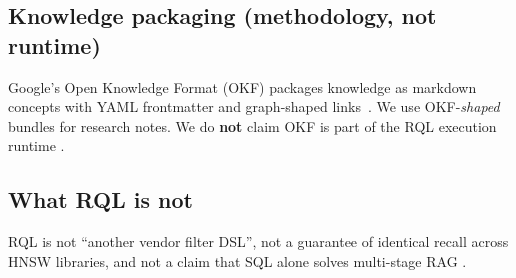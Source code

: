 \subsection{Knowledge packaging (methodology, not runtime)}
Google's Open Knowledge Format (OKF) packages knowledge as markdown concepts with YAML frontmatter and graph-shaped links~\citep{okf2025}.
We use OKF-\emph{shaped} bundles for research notes.
We do \textbf{not} claim OKF is part of the RQL execution runtime \established{}.

\subsection{What RQL is not}
RQL is not ``another vendor filter DSL'', not a guarantee of identical recall across HNSW libraries, and not a claim that SQL alone solves multi-stage RAG \hypothesis{}.
